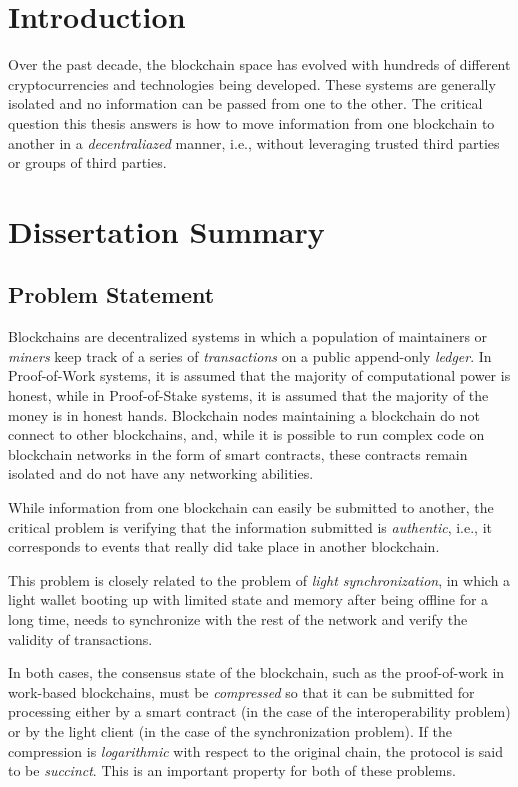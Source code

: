 \section{Introduction}
Over the past decade, the blockchain space has evolved with hundreds of
different cryptocurrencies and technologies being developed. These systems
are generally isolated and no information can be passed from one to the
other. The critical question this thesis answers is how to move information
from one blockchain to another in a \emph{decentraliazed} manner, i.e.,
without leveraging trusted third parties or groups of third parties.

\section{Dissertation Summary}

\subsection{Problem Statement}
Blockchains are decentralized systems in which a population of maintainers
or \emph{miners} keep track of a series of \emph{transactions} on a public
append-only \emph{ledger}. In Proof-of-Work systems, it is assumed that the
majority of computational power is honest, while in Proof-of-Stake systems,
it is assumed that the majority of the money is in honest hands. Blockchain
nodes maintaining a blockchain do not connect to other blockchains, and,
while it is possible to run complex code on blockchain networks in the form
of smart contracts, these contracts remain isolated and do not have any
networking abilities.

While information from one blockchain can easily be submitted to another,
the critical problem is verifying that the information submitted is
\emph{authentic}, i.e., it corresponds to events that really did take place
in another blockchain.

This problem is closely related to the problem of \emph{light
synchronization}, in which a light wallet booting up with limited state
and memory after being offline for a long time, needs to synchronize
with the rest of the network and verify the validity of transactions.

In both cases, the consensus state of the blockchain, such as the
proof-of-work in work-based blockchains, must be \emph{compressed} so
that it can be submitted for processing either by a smart contract (in
the case of the interoperability problem) or by the light client (in the
case of the synchronization problem). If the compression is
\emph{logarithmic} with respect to the original chain, the protocol
is said to be \emph{succinct}. This is an important property for both
of these problems.

